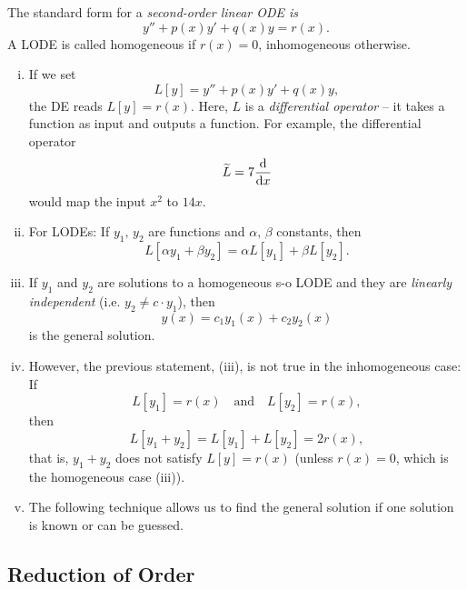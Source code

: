 \begin{definition}
	The standard form for a \emph{second-order linear ODE is}
	\[ y''+p(x)y'+q(x)y=r(x). \]
	A LODE is called homogeneous if $r(x)=0$, inhomogeneous otherwise.
\end{definition}

\begin{remark}
\label{rem:s-o_lode}
\begin{enumerate}[(i)]
	\item If we set
	\[ L[y]=y''+p(x)y'+q(x)y, \]
	the DE reads $L[y]=r(x)$. Here, $L$ is a \emph{differential operator} -- it takes a function as input and outputs a function. For example, the differential operator
	\[ \widetilde{L}=7\displaystyle{\frac{\mathrm{d}}{\mathrm{d}x}} \]
	would map the input $x^2$ to $14x$.
	\item For LODEs: If $y_1,\,y_2$ are functions and $\alpha,\,\beta$ constants, then
	\[ L[\alpha y_1 + \beta y_2] = \alpha L[y_1] + \beta L[y_2]. \]
	\item If $y_1$ and $y_2$ are solutions to a homogeneous s-o LODE and they are \emph{linearly independent} (i.e. $y_2 \not= c \cdot y_1$), then
	\[ y(x) = c_1 y_1(x) + c_2 y_2(x) \]
	is the general solution.
	\item However, the previous statement, (iii), is not true in the inhomogeneous case: If
	\[ L[y_1] = r(x) \quad \text{and} \quad L[y_2] = r(x), \]
	then
	\[ L[y_1+y_2] = L[y_1] + L[y_2] = 2r(x), \]
	that is, $y_1+y_2$ does not satisfy $L[y]=r(x)$ (unless $r(x)=0$, which is the homogeneous case (iii)).
	\item The following technique allows us to find the general solution if one solution is known or can be guessed.
\end{enumerate}
\end{remark}

\subsection{Reduction of Order}

